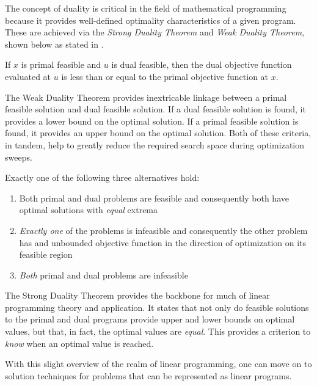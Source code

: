 The concept of duality is critical in the field of mathematical programming
because it provides well-defined optimality characteristics of a given
program. These are achieved via the \textit{Strong Duality Theorem}
and \textit{Weak Duality Theorem}, shown below as stated
in \cite{ferris_linear_2008}.

\begin{thm}
If $x$ is primal feasible and $u$ is dual feasible, then the dual objective
function evaluated at $u$ is less than or equal to the primal objective function
at $x$.
\end{thm}

The Weak Duality Theorem provides inextricable linkage between a primal feasible
solution and dual feasible solution. If a dual feasible solution is found, it
provides a lower bound on the optimal solution. If a primal feasible solution is
found, it provides an upper bound on the optimal solution. Both of these
criteria, in tandem, help to greatly reduce the required search space during
optimization sweeps.

\begin{thm}
Exactly one of the following three alternatives hold:
\begin{enumerate}

  \item Both primal and dual problems are feasible and consequently both have
  optimal solutions with \textit{equal} extrema

  \item \textit{Exactly one} of the problems is infeasible and consequently the
  other problem has and unbounded objective function in the direction of
  optimization on its feasible region

  \item \textit{Both} primal and dual problems are infeasible

\end{enumerate}
\end{thm}

The Strong Duality Theorem provides the backbone for much of linear programming
theory and application. It states that not only do feasible solutions to the
primal and dual programs provide upper and lower bounds on optimal values, but
that, in fact, the optimal values are \textit{equal}. This provides a criterion
to \textit{know} when an optimal value is reached.

With this slight overview of the realm of linear programming, one can move on to
solution techniques for problems that can be represented as linear programs.
